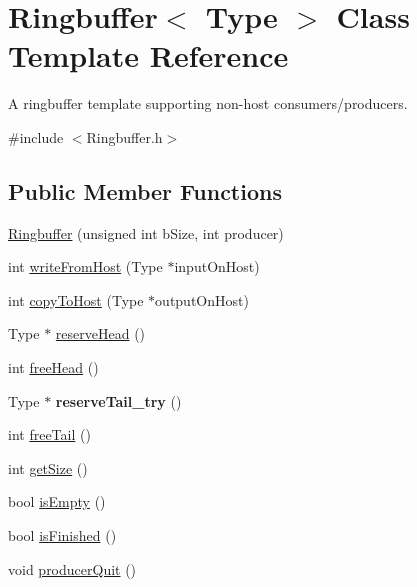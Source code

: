 \hypertarget{classRingbuffer}{\section{Ringbuffer$<$ Type $>$ Class Template Reference}
\label{classRingbuffer}
}


A ringbuffer template supporting non-\/host consumers/producers.  




{\ttfamily \#include $<$Ringbuffer.\-h$>$}

\subsection*{Public Member Functions}
\begin{DoxyCompactItemize}
\item 
\hyperlink{classRingbuffer_ae2ff732b1a9a88f95d57ce27330c00ad}{Ringbuffer} (unsigned int b\-Size, int producer)
\item 
int \hyperlink{classRingbuffer_ac8b2973f3ab190cf778535c394ba980d}{write\-From\-Host} (Type $\ast$input\-On\-Host)
\item 
int \hyperlink{classRingbuffer_a97f008c10065843bbab49579c8ce3ce4}{copy\-To\-Host} (Type $\ast$output\-On\-Host)
\item 
Type $\ast$ \hyperlink{classRingbuffer_acf64a0c3c16f208dd1191130b0d18b33}{reserve\-Head} ()
\item 
int \hyperlink{classRingbuffer_a1d8b62be3d51a00930e7b06d1ad2df53}{free\-Head} ()
\item 
\hypertarget{classRingbuffer_ae706d005e224e970c7b53115a9d5e5af}{Type $\ast$ {\bfseries reserve\-Tail\-\_\-try} ()}\label{classRingbuffer_ae706d005e224e970c7b53115a9d5e5af}

\item 
int \hyperlink{classRingbuffer_a66193754bca336ed8b8f2d5a9a89995c}{free\-Tail} ()
\item 
int \hyperlink{classRingbuffer_aefca234ed766de811794f6ab91e86d17}{get\-Size} ()
\item 
bool \hyperlink{classRingbuffer_af746d95cfff3115957d01181484be191}{is\-Empty} ()
\item 
bool \hyperlink{classRingbuffer_ac43a1bbfa6c41dd0aba33c70248425a6}{is\-Finished} ()
\item 
void \hyperlink{classRingbuffer_ae40e43d8729f0cfdcb97675cda52b05f}{producer\-Quit} ()
\end{DoxyCompactItemize}


